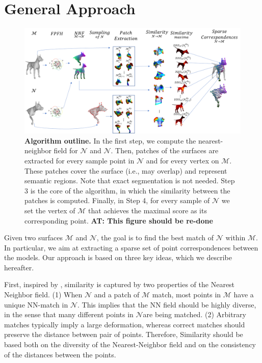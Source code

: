 \documentclass[10pt,twocolumn,letterpaper]{article}
\newcommand{\colornote}[3]{{\color{#1}\bf{#2: #3}\normalfont}}
\newcommand{\colornote}[3]{}
\newcommand {\ayellet}[1]{\colornote{blue}{AT}{#1}}
\begin{document}
\section{General Approach}
\label{sec:approach}
\begin{figure}[htb]
	\centering
	\includegraphics[width=1\textwidth]{figures/Birds_Flight.png}
	\caption{{\bf Algorithm outline.}
    In the first step, we compute the nearest-neighbor field for $\mathcal{N}$ and $\mathcal{N}$.
    Then, patches of the surfaces are extracted for every sample point in $\mathcal{N}$ and for every vertex on $\mathcal{M}$.
    These patches cover the surface (i.e., may overlap) and represent semantic regions. 
    Note that exact segmentation is not needed.
    Step 3 is the core of the algorithm, in which the similarity between the patches is computed.
    Finally, in Step 4, for every sample of $\mathcal{N}$ we set the vertex of $\mathcal{M}$ that achieves the maximal score as its corresponding point.
	\ayellet{This figure should be re-done}
	}
	\label{fig:overview}
\end{figure}

Given two surfaces $\mathcal{M}$ and $\mathcal{N}$, the goal is to find the best match of  $\mathcal{N}$ within  $\mathcal{M}$.
In particular, we aim at extracting a sparse set of point correspondences between the models. 
Our approach is based on three key ideas, which we describe hereafter.

First, inspired by \cite{talmi2017template}, similarity is captured by two properties of the Nearest Neighbor field. 
(1) When $\mathcal{N}$ and a patch of $\mathcal{M}$ match, most points in $\mathcal{M}$ have a unique NN-match in $\mathcal{N}$. 
This implies that the NN field should be highly diverse, in the sense that many different points in $\mathcal{N}$are being matched.
(2) Arbitrary matches typically imply a large deformation, whereas correct matches should preserve the distance between pair of points.
Therefore, Similarity should be based both on the diversity of the Nearest-Neighbor field and on the consistency of the distances between the points.
\end{document}
